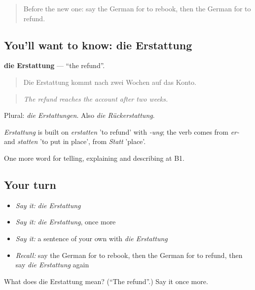 \label{lesson:GE-C420-erstattung}



\begin{quote}
Before the new one: say the German for to rebook, then the German for to refund.
\end{quote}

\subsection*{You'll want to know: die Erstattung}
\textbf{die Erstattung} — \textquotedblleft{}the refund\textquotedblright{}.

\begin{quote}
Die Erstattung kommt nach zwei Wochen auf das Konto.
\end{quote}

\begin{quote}
\emph{The refund reaches the account after two weeks.}
\end{quote}

Plural: \emph{die Erstattungen}. Also \emph{die Rückerstattung}.

\begin{cousinweb}
\emph{Erstattung} is built on \emph{erstatten} 'to refund' with \emph{-ung}; the verb comes from \emph{er-} and \emph{statten} 'to put in place', from \emph{Statt} 'place'.
\end{cousinweb}

\begin{grammarlens}[title={What you've built}]
One more word for telling, explaining and describing at B1.
\end{grammarlens}

\subsection*{Your turn}
\begin{itemize}
\raggedright
  \item \emph{Say it:} \emph{die Erstattung}
  \item \emph{Say it:} \emph{die Erstattung}, once more
  \item \emph{Say it:} a sentence of your own with \emph{die Erstattung}
  \item \emph{Recall:} say the German for to rebook, then the German for to refund, then say \emph{die Erstattung} again
\end{itemize}

\begin{tcolorbox}[breakable,colback=teal!4,colframe=teal!35!black,title={Before you move on}]
What does die Erstattung mean? (\textquotedblleft{}The refund\textquotedblright{}.) Say it once more.
\end{tcolorbox}
